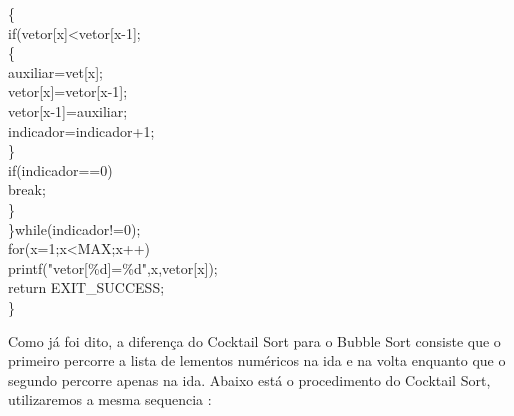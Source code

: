 \documentclass[11pts]{book}
\begin{document}
{\{ \\
if(vetor[x]<vetor[x-1]; \\
\{ \\
auxiliar=vet[x]; \\
vetor[x]=vetor[x-1]; \\
vetor[x-1]=auxiliar; \\
indicador=indicador+1; \\
\} \\
if(indicador==0)\\
break; \\
\} \\
\}while(indicador!=0); \\
for(x=1;x<MAX;x++) \\
printf("vetor[\%d]=\%d",x,vetor[x]); \\
return EXIT\_SUCCESS; \\
\} \\
}

\newpage



Como já foi dito, a diferença do Cocktail Sort para o Bubble Sort consiste que o primeiro percorre a lista de lementos numéricos na ida e na volta enquanto que o segundo percorre apenas na ida. Abaixo está o procedimento do Cocktail Sort, utilizaremos a mesma sequencia  :
\end{document}
